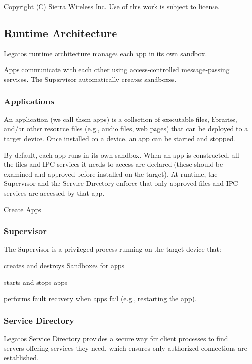 Copyright (C) Sierra Wireless Inc. Use of this work is subject to license. \hypertarget{basicRuntimeArch}{}\subsection{Runtime Architecture}\label{basicRuntimeArch}
Legato\textquotesingle{}s runtime architecture manages each app in its own sandbox.



Apps communicate with each other using access-\/controlled message-\/passing services. The Supervisor automatically creates sandboxes.\hypertarget{basic_runtime_arch_basicRuntimeArch_apps}{}\subsubsection{Applications}\label{basic_runtime_arch_basicRuntimeArch_apps}
An application (we call them \textquotesingle{}apps\textquotesingle{}) is a collection of executable files, libraries, and/or other resource files (e.\+g., audio files, web pages) that can be deployed to a target device. Once installed on a device, an app can be started and stopped.

By default, each app runs in its own sandbox. When an app is constructed, all the files and I\+P\+C services it needs to access are declared (these should be examined and approved before installed on the target). At runtime, the Supervisor and the Service Directory enforce that only approved files and I\+P\+C services are accessed by that app.

\hyperlink{basicAppsCreate}{Create Apps}\hypertarget{basic_runtime_arch_basicRuntimeArch_supervisor}{}\subsubsection{Supervisor}\label{basic_runtime_arch_basicRuntimeArch_supervisor}
The Supervisor is a privileged process running on the target device that\+:
\begin{DoxyItemize}
\item creates and destroys \hyperlink{basicSecuritySandbox}{Sandboxes} for apps
\item starts and stops apps
\item performs fault recovery when apps fail (e.\+g., restarting the app).
\end{DoxyItemize}\hypertarget{basic_runtime_arch_basicRuntimeArch_serviceDirectory}{}\subsubsection{Service Directory}\label{basic_runtime_arch_basicRuntimeArch_serviceDirectory}
Legato\textquotesingle{}s Service Directory provides a secure way for client processes to find servers offering services they need, which ensures only authorized connections are established.

